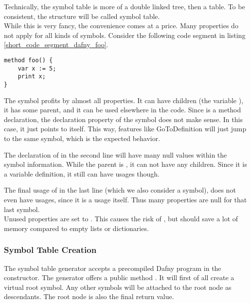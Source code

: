 Technically, the symbol table is more of a double linked tree, then a table.
To be consistent, the structure will be called symbol table.\\

While this is very fancy, the convenience comes at a price.
Many properties do not apply for all kinds of symbols.
Consider the following code segment in listing \ref{short_code_segment_dafny_foo}.

\begin{lstlisting}[language=dafny, caption={Example Code Regarding Symbol Information}, captionpos=b, label={lst:short_code_segment_dafny_foo}]
method foo() {
    var x := 5;
    print x;
}
\end{lstlisting}

The symbol  profits by almost all properties.
It can have children (the variable ), it has some parent, and it can be used elsewhere in the code.
Since  is a method declaration, the declaration property of the symbol does not make sense.
In this case, it just points to itself.
This way, features like GoToDefinition will just jump to the same symbol, which is the expected behavior.

The declaration of  in the second line will have many null values within the symbol information.
While the parent is , it can not have any children.
Since it is a variable definition, it still can have usages though.

The final usage of  in the last line (which we also consider a symbol), does not even have usages, since it is a usage itself.
Thus many properties are null for that last symbol.\\

Unused properties are set to .
This causes the risk of , but should save a lot of memory compared to empty lists or dictionaries.\\

\subsubsection{Symbol Table Creation}
The symbol table generator accepts a precompiled Dafny program in the constructor.
The generator offers a public method .
It will first of all create a virtual root symbol.
Any other symbols will be attached to the root node as descendants.
The root node is also the final return value.\\

